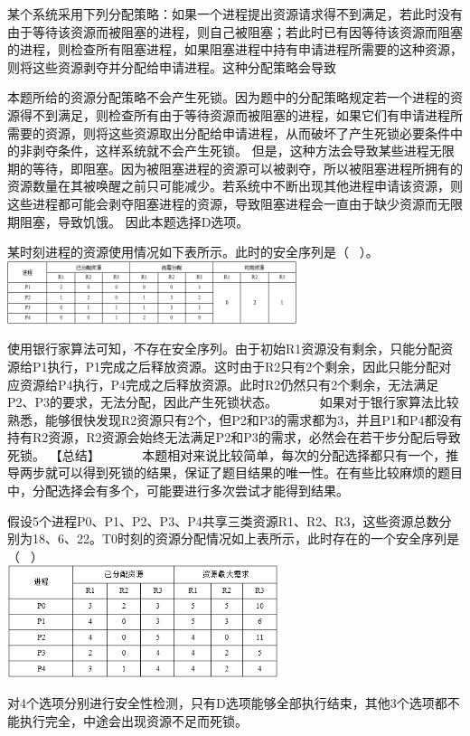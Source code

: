 \question 某个系统采用下列分配策略：如果一个进程提出资源请求得不到满足，若此时没有由于等待该资源而被阻塞的进程，则自己被阻塞；若此时已有因等待该资源而阻塞的进程，则检查所有阻塞进程，如果阻塞进程中持有申请进程所需要的这种资源，则将这些资源剥夺并分配给申请进程。这种分配策略会导致
\par{}
\begin{solution}本题所给的资源分配策略不会产生死锁。因为题中的分配策略规定若一个进程的资源得不到满足，则检查所有由于等待资源而被阻塞的进程，如果它们有申请进程所需要的资源，则将这些资源取出分配给申请进程，从而破坏了产生死锁必要条件中的非剥夺条件，这样系统就不会产生死锁。
但是，这种方法会导致某些进程无限期的等待，即阻塞。因为被阻塞进程的资源可以被剥夺，所以被阻塞进程所拥有的资源数量在其被唤醒之前只可能减少。若系统中不断出现其他进程申请该资源，则这些进程都可能会剥夺阻塞进程的资源，导致阻塞进程会一直由于缺少资源而无限期阻塞，导致饥饿。
因此本题选择D选项。
\end{solution}
\question 某时刻进程的资源使用情况如下表所示。此时的安全序列是（
~）。\includegraphics[width=3.33333in,height=0.71875in]{computerassets/42b88243077ecc1d531d920fb4b79fe3.jpeg}
\par{}
\begin{solution}使用银行家算法可知，不存在安全序列。由于初始R1资源没有剩余，只能分配资源给P1执行，P1完成之后释放资源。这时由于R2只有2个剩余，因此只能分配对应资源给P4执行，P4完成之后释放资源。此时R2仍然只有2个剩余，无法满足P2、P3的要求，无法分配，因此产生死锁状态。
~ ~ ~
~如果对于银行家算法比较熟悉，能够很快发现R2资源只有2个，但P2和P3的需求都为3，并且P1和P4都没有持有R2资源，R2资源会始终无法满足P2和P3的需求，必然会在若干步分配后导致死锁。
【总结】 ~ ~ ~
~本题相对来说比较简单，每次的分配选择都只有一个，推导两步就可以得到死锁的结果，保证了题目结果的唯一性。在有些比较麻烦的题目中，分配选择会有多个，可能要进行多次尝试才能得到结果。
\end{solution}
\question 假设5个进程P0、P1、P2、P3、P4共享三类资源R1、R2、R3，这些资源总数分别为18、6、22。T0时刻的资源分配情况如上表所示，此时存在的一个安全序列是（
~）\\

\includegraphics[width=3.12500in,height=1.29167in]{computerassets/87C28FE0EB82CF475B0E849EEE5BB8AC.png}
\par{}
\begin{solution}对4个选项分别进行安全性检测，只有D选项能够全部执行结束，其他3个选项都不能执行完全，中途会出现资源不足而死锁。
\end{solution}
